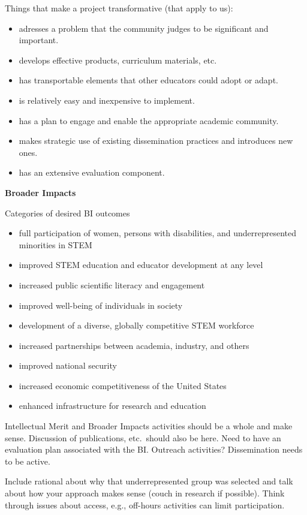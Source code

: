 \documentclass[12pt]{article}
\begin{document}
Things that make a project transformative (that apply to us):
\begin{itemize}
\item adresses a problem that the community judges to be significant and
  important.
\item develops effective products, curriculum materials, etc.
\item has transportable elements that other educators could adopt or adapt.
\item is relatively easy and inexpensive to implement.
\item has a plan to engage and enable the appropriate academic community.
\item makes strategic use of existing dissemination practices and introduces
  new ones.
\item has an extensive evaluation component.
\end{itemize}


\noindent \textbf{Broader Impacts}

Categories of desired BI outcomes
\begin{itemize}
\item full participation of women, persons with disabilities, and
  underrepresented minorities in STEM
\item improved STEM education and educator development at any level
\item increased public scientific literacy and engagement
\item improved well-being of individuals in society
\item development of a diverse, globally competitive STEM workforce
\item increased partnerships between academia, industry, and others
\item improved national security
\item increased economic competitiveness of the United States
\item enhanced infrastructure for research and education
\end{itemize}

Intellectual Merit and Broader Impacts activities should be a whole and make
sense. Discussion of publications, etc.\ should also be here. Need to have an
evaluation plan associated with the BI. Outreach activities? Dissemination
needs to be active.

Include rational about why that underrepresented group was selected and talk
about how your approach makes sense (couch in research if possible). Think
through issues about access, e.g., off-hours activities can limit participation.
\end{document}
